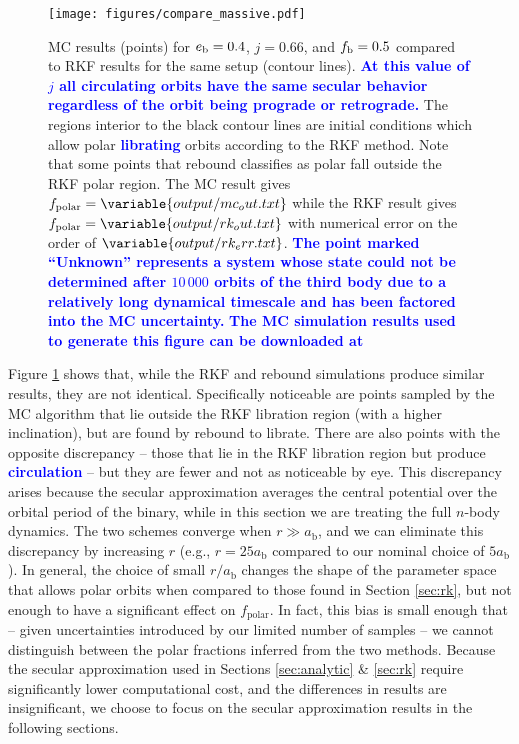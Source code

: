 \documentclass[twocolumn,linenumbers]{aastex631}
\newcommand{\RR}[1]{\textcolor{blue}{\bf#1}} %
\newcommand{\RP}[1]{\RR{#1}} %
\begin{document}
\begin{figure}
    \begin{centering}
        \texttt{[image: figures/compare\_massive.pdf]}
        \caption{
            MC results (points) for $e_{\rm b}=0.4$, $j=0.66$, and $f_{\rm b}=0.5$ compared to RKF results for the same setup (contour lines).
            \RR{At this value of $j$ all circulating orbits have the same secular behavior regardless of the orbit being prograde or retrograde.}
             The regions interior to the black contour lines are initial conditions which allow polar \RR{librating} orbits according to the RKF method.
            Note that some points that {\sc rebound} classifies as polar fall outside the RKF polar region.
            The MC result gives $f_{\text{polar}} = \variable{output/mc_out.txt}$ while the RKF result gives $f_{\text{polar}} = \variable{output/rk_out.txt}$ with
            numerical error on the order of $\variable{output/rk_err.txt}$. \RR{The point marked ``Unknown'' represents a system whose state could not be determined after $10\,000$ orbits of the third body due to a relatively long dynamical timescale and has been factored into the MC uncertainty.} \RR{The MC simulation results used to generate this figure can be downloaded at \dataset[doi: 10.5281/zenodo.14736363]{\doi{10.5281/zenodo.14736363}}}
        }
        \label{fig:rkf}
    \end{centering}
\end{figure}

Figure \ref{fig:rkf} shows that, while the RKF and {\sc rebound} simulations produce similar results, they are not identical. Specifically noticeable are points sampled by the MC algorithm that lie outside the RKF libration region (with a higher inclination), but are found by {\sc rebound} to librate. There are also points with the opposite discrepancy -- those that lie in the RKF libration region but produce \RP{circulation} -- but they are fewer and not as noticeable by eye. This discrepancy arises because the secular approximation averages the central potential over the orbital period of the binary, while in this section we are treating the full $n$-body dynamics. The two schemes converge when $r \gg a_\text{b}$, and we can eliminate this discrepancy by increasing $r$ (e.g., $r=25a_\text{b}$ compared to our nominal choice of $5a_\text{b}$). In general, the choice of small $r/a_\text{b}$ changes the shape of the parameter space that allows polar orbits when compared to those found in Section \ref{sec:rk}, but not enough to have a significant effect on $f_\text{polar}$. In fact, this bias is small enough that -- given uncertainties introduced by our limited number of samples -- we cannot distinguish between the polar fractions inferred from the two methods. Because the secular approximation used in Sections \ref{sec:analytic} \& \ref{sec:rk} require significantly lower computational cost, and the differences in results are insignificant, we choose to focus on the secular approximation results in the following sections.
\end{document}
